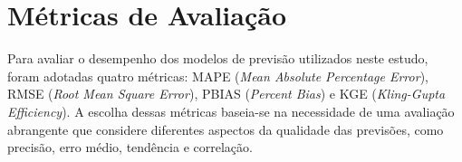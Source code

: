 \section{Métricas de Avaliação}

Para avaliar o desempenho dos modelos de previsão utilizados neste estudo, foram adotadas quatro métricas: MAPE (\textit{Mean Absolute Percentage Error}), RMSE (\textit{Root Mean Square Error}), PBIAS (\textit{Percent Bias}) e KGE (\textit{Kling-Gupta Efficiency}). A escolha dessas métricas baseia-se na necessidade de uma avaliação abrangente que considere diferentes aspectos da qualidade das previsões, como precisão, erro médio, tendência e correlação.


